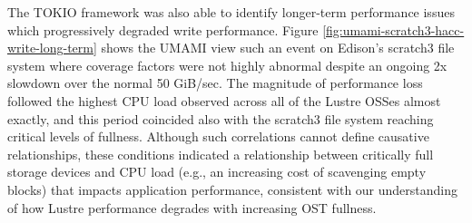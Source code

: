 
% 

The TOKIO framework was also able to identify longer-term performance issues which progressively degraded write performance. Figure \ref{fig:umami-scratch3-hacc-write-long-term} shows the UMAMI view such an event on Edison's scratch3 file system where coverage factors were not highly abnormal despite an ongoing 2x slowdown over the normal 50 GiB/sec.  The magnitude of performance loss followed the highest CPU load observed across all of the Lustre OSSes almost exactly, and this period coincided also with the scratch3 file system reaching critical levels of fullness.  Although such correlations cannot define causative relationships, these conditions indicated a relationship between critically full storage devices and CPU load (e.g., an increasing cost of scavenging empty blocks) that impacts application performance, consistent with our understanding of how Lustre performance degrades with increasing OST fullness.
 
